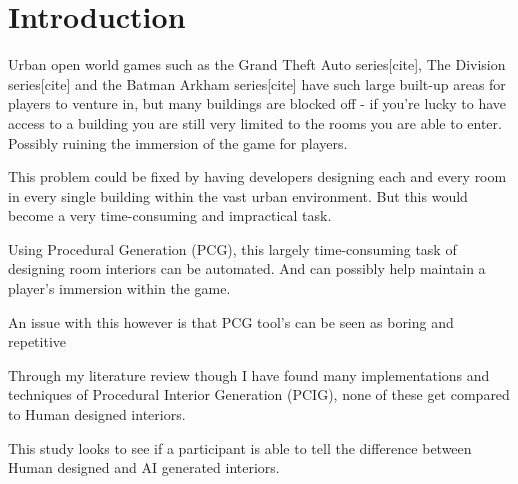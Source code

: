 \section{Introduction}

Urban open world games such as the Grand Theft Auto series[cite], The Division series[cite] and the Batman Arkham series[cite]
have such large built-up areas for players to venture in, but many buildings are blocked off - 
if you're lucky to have access to a building you are still very limited to the rooms you are able to enter.
Possibly ruining the immersion of the game for players.

This problem could be fixed by having developers designing each and every room in every single building within the vast urban environment.
But this would become a very time-consuming and impractical task.

Using Procedural Generation (PCG), this largely time-consuming task of designing room interiors can be automated. And can possibly help maintain a player's immersion within the game.

An issue with this however is that PCG tool's can be seen as boring and repetitive \cite{pcg_in_gd} 

Through my literature review though I have found many implementations and techniques of Procedural Interior Generation (PCIG), none of these get compared to Human designed interiors. 

This study looks to see if a participant is able to tell the difference between Human designed and AI generated interiors.






